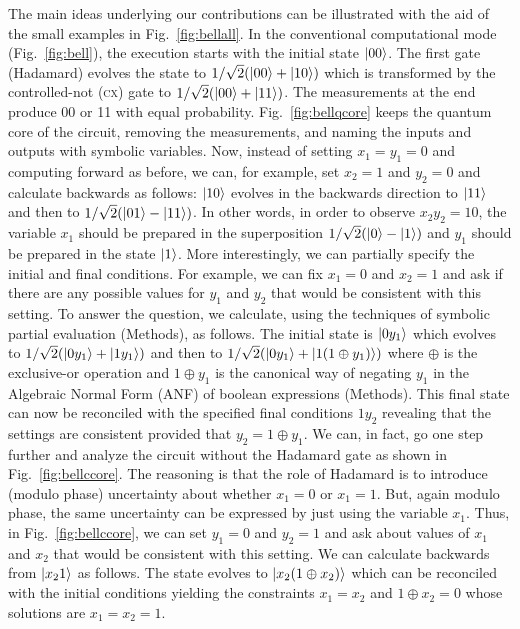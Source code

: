 \documentclass{article}
\newcommand{\cx}{\textsc{cx}}
\begin{document}
\begin{refsection}
The main ideas underlying our contributions can be illustrated with
the aid of the small examples in Fig.~\ref{fig:bellall}. In the
conventional computational mode (Fig.~\ref{fig:bell}), the execution
starts with the initial state $\ket{00}$. The first gate (Hadamard)
evolves the state to $1/\sqrt{2}(\ket{00} + \ket{10})$ which is
transformed by the controlled-not (\cx) gate to $1/\sqrt{2}(\ket{00} +
\ket{11})$. The measurements at the end produce 00 or 11 with equal
probability. Fig.~\ref{fig:bellqcore} keeps the quantum core of the
circuit, removing the measurements, and naming the inputs and outputs
with symbolic variables. Now, instead of setting $x_1=y_1=0$ and
computing forward as before, we can, for example, set $x_2=1$ and
$y_2=0$ and calculate backwards as follows: $\ket{10}$ evolves in the
backwards direction to $\ket{11}$ and then to
$1/\sqrt{2}(\ket{01}-\ket{11})$. In other words, in order to observe
$x_2y_2=10$, the variable $x_1$ should be prepared in the
superposition $1/\sqrt{2}(\ket{0}-\ket{1})$ and $y_1$ should be
prepared in the state $\ket{1}$. More interestingly, we can partially
specify the initial and final conditions. For example, we can fix
$x_1=0$ and $x_2=1$ and ask if there are any possible values for $y_1$
and $y_2$ that would be consistent with this setting. To answer the
question, we calculate, using the techniques of symbolic partial
evaluation (Methods), as follows. The initial state is $\ket{0y_1}$
which evolves to $1/\sqrt{2}(\ket{0y_1}+\ket{1y_1})$ and then to
$1/\sqrt{2}(\ket{0y_1}+\ket{1(1 \oplus y_1)})$ where $\oplus$ is the
exclusive-or operation and $1 \oplus y_1$ is the canonical way of
negating $y_1$ in the Algebraic Normal Form (ANF) of boolean
expressions (Methods). This final state can now be reconciled with the
specified final conditions $1y_2$ revealing that the settings are
consistent provided that $y_2 = 1 \oplus y_1$. We can, in fact, go one
step further and analyze the circuit without the Hadamard gate as
shown in Fig.~\ref{fig:bellccore}. The reasoning is that the role of
Hadamard is to introduce (modulo phase) uncertainty about whether
$x_1=0$ or $x_1=1$. But, again modulo phase, the same uncertainty can
be expressed by just using the variable $x_1$. Thus, in
Fig.~\ref{fig:bellccore}, we can set $y_1=0$ and $y_2=1$ and ask about
values of $x_1$ and $x_2$ that would be consistent with this
setting. We can calculate backwards from $\ket{x_21}$ as follows. The
state evolves to $\ket{x_2(1 \oplus x_2)}$ which can be reconciled
with the initial conditions yielding the constraints $x_1=x_2$ and $1
\oplus x_2 = 0$ whose solutions are $x_1 = x_2 = 1$.


\end{refsection}
\end{document}

